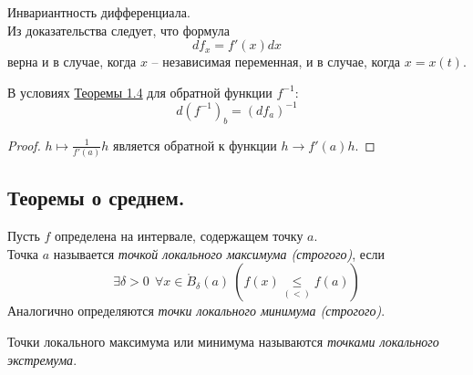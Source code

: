 \begin{note}{Инвариантность дифференциала.}\\
    Из доказательства следует, что формула
    \[df_{x} = f'(x)dx\]
    верна и в случае, когда $x$ -- независимая переменная, и в случае, когда $x = x(t)$.
\end{note}

\begin{corollary}
    В условиях \hyperlink{th4}{Теоремы 1.4} для обратной функции $f^{-1}$:
    \[d(f^{-1})_{b} = (df_{a})^{-1}\]
\end{corollary}

\begin{proof}
    $h \mapsto \frac{1}{f'(a)}h$ является обратной к функции $h \to f'(a)h$.
\end{proof}

\subsection{Теоремы о среднем.}

\begin{definition}
    Пусть $f$ определена на интервале, содержащем точку $a$.\\
    Точка $a$ называется \textit{точкой локального максимума (строгого)}, если 
    \[\exists \delta > 0 \ \ \forall x \in \mathring{B}_{\delta}(a) \ (f(x) \underset{(<)}{\leq} f(a))\]
    Аналогично определяются \textit{точки локального минимума (строгого)}.
\end{definition}

Точки локального максимума или минимума называются \textit{точками локального экстремума}.

\begin{example}

\end{example}
\begin{center}
\end{center}

